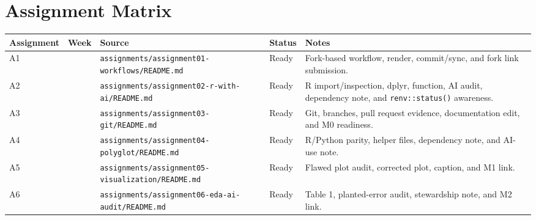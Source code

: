 \documentclass[
  letterpaper,
  DIV=11,
  numbers=noendperiod,
  oneside]{scrreprt}
\begin{document}
\section{Assignment Matrix}\label{assignment-matrix}

\begin{longtable}[]{@{}
  >{\raggedright\arraybackslash}p{}
  >{\raggedleft\arraybackslash}p{}
  >{\raggedright\arraybackslash}p{}
  >{\raggedright\arraybackslash}p{}
  >{\raggedright\arraybackslash}p{}@{}}
\toprule\noalign{}
\begin{minipage}[b]{\linewidth}\raggedright
Assignment
\end{minipage} & \begin{minipage}[b]{\linewidth}\raggedleft
Week
\end{minipage} & \begin{minipage}[b]{\linewidth}\raggedright
Source
\end{minipage} & \begin{minipage}[b]{\linewidth}\raggedright
Status
\end{minipage} & \begin{minipage}[b]{\linewidth}\raggedright
Notes
\end{minipage} \\
\midrule\noalign{}
\endhead
\bottomrule\noalign{}
\endlastfoot
A1 & 2 & \texttt{assignments/assignment01-workflows/README.md} & Ready &
Fork-based workflow, render, commit/sync, and fork link submission. \\
A2 & 3 & \texttt{assignments/assignment02-r-with-ai/README.md} & Ready &
R import/inspection, dplyr, function, AI audit, dependency note, and
\texttt{renv::status()} awareness. \\
A3 & 4 & \texttt{assignments/assignment03-git/README.md} & Ready & Git,
branches, pull request evidence, documentation edit, and M0
readiness. \\
A4 & 5 & \texttt{assignments/assignment04-polyglot/README.md} & Ready &
R/Python parity, helper files, dependency note, and AI-use note. \\
A5 & 6 & \texttt{assignments/assignment05-visualization/README.md} &
Ready & Flawed plot audit, corrected plot, caption, and M1 link. \\
A6 & 7 & \texttt{assignments/assignment06-eda-ai-audit/README.md} &
Ready & Table 1, planted-error audit, stewardship note, and M2 link. \\

\end{longtable}
\end{document}
